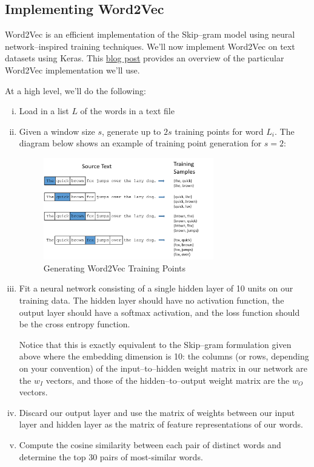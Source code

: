 \subsection{Implementing Word2Vec}
Word2Vec is an efficient implementation of the Skip--gram model using neural network--inspired training techniques. We'll now implement Word2Vec on text datasets using Keras.  This 
\href{http://mccormickml.com/2016/04/19/word2vec-tutorial-the-skip-gram-model/}{blog post} provides an overview of the particular Word2Vec implementation we'll use.

At a high level, we'll do the following:
\begin{enumerate} [(i)]
\item
Load in a list $L$ of the words in a text file

\item
Given a window size $s$, generate up to $2s$ training points for
word $L_i$. The diagram below shows an example of training point generation for $s = 2$:

\begin{figure}[H]
\begin{center}
\includegraphics[width=0.7\textwidth]{plots/training_data_example.png}
\caption{Generating Word2Vec Training Points}
\end{center}
\end{figure}


\item
Fit a neural network consisting of a single hidden layer of 10 units on our training data.  The hidden layer should have no activation function, the output layer should have a softmax activation, and the loss function should be the cross entropy function.  

Notice that this is exactly equivalent to the Skip--gram formulation given above where the embedding dimension is 10: the columns (or rows, depending on your convention) of the input--to--hidden weight matrix in our network are the $w_I$ vectors, and those of the hidden--to--output weight matrix are the $w_O$ vectors.

\item
Discard our output layer and use the matrix of weights between our input layer and hidden layer as the matrix of feature representations of our words.

\item
Compute the cosine similarity between each pair of distinct words and determine the top 30 pairs of most-similar words.
\end{enumerate}

